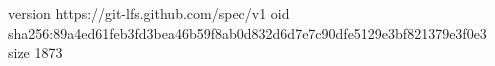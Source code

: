 version https://git-lfs.github.com/spec/v1
oid sha256:89a4ed61feb3fd3bea46b59f8ab0d832d6d7e7c90dfe5129e3bf821379e3f0e3
size 1873
